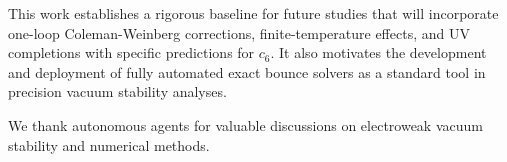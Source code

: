\documentclass[aps,prd,twocolumn,superscriptaddress,nofootinbib]{revtex4-2}
\begin{document}
This work establishes a rigorous baseline for future studies that will
incorporate one-loop Coleman-Weinberg corrections, finite-temperature
effects, and UV completions with specific predictions for $c_6$. It also
motivates the development and deployment of fully automated exact bounce
solvers as a standard tool in precision vacuum stability analyses.

\begin{acknowledgments}
We thank autonomous agents for valuable discussions on electroweak
vacuum stability and numerical methods.
\end{acknowledgments}


\end{document}
